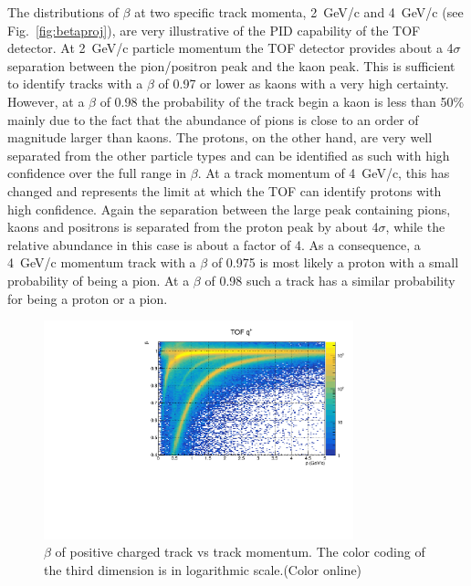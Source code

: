The distributions of $\beta$ at two specific track momenta, 2~GeV/c and 4~GeV/c (see Fig.~\ref{fig:betaproj}), are very illustrative of the PID capability of the TOF detector. At 2~GeV/c particle momentum the TOF detector provides about a 4$\sigma$ separation between
the pion/positron peak and the kaon peak. This is sufficient to identify tracks with a $\beta$ of 0.97 or lower as kaons with a very
high certainty. However, at a $\beta$ of 0.98 the probability of the track begin a kaon is less than 50\% mainly due to the fact
that the abundance of pions is close to an order of magnitude larger than kaons. The protons, on the other hand, are very well
separated from the other particle types and can be identified as such with high confidence over the full range in $\beta$.
At a track momentum of 4~GeV/c, this has changed and represents the limit at which the TOF can identify protons with high confidence. Again the separation between the large peak containing pions, kaons and positrons is separated from the proton
peak by about 4$\sigma$, while the relative abundance in this case is about a factor of 4. As a consequence, a 4~GeV/c momentum
track with a $\beta$ of 0.975 is most likely a proton with a small probability of being a pion. At a $\beta$ of 0.98 such
a track has a similar probability for being a proton or a pion.
\begin{figure}[tbp]
\begin{center}
\includegraphics[width=0.8\textwidth]{figures/beta_vs_p_positivetracks.pdf}
\caption{\label{fig:betavsp}$\beta$ of positive charged track vs track momentum. The color coding of the third dimension
is in logarithmic scale.(Color online)}
\end{center}
\end{figure}

